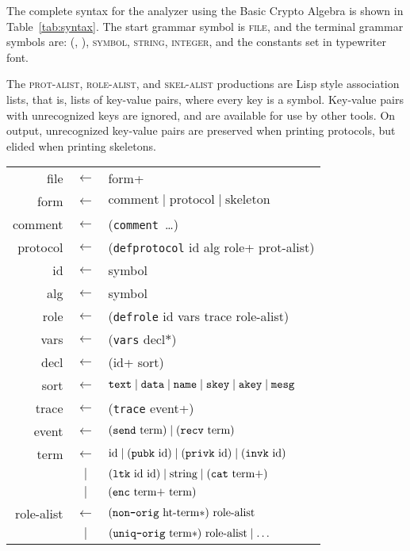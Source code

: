 The complete syntax for the analyzer using the Basic Crypto Algebra is
shown in Table~\ref{tab:syntax}.  The start grammar symbol is
\textsc{file}, and the terminal grammar symbols are: \textsc{(, ),
  symbol, string, integer,} and the constants set in typewriter font.

The \textsc{prot-alist}, \textsc{role-alist}, and \textsc{skel-alist}
productions are Lisp style association lists, that is, lists of
key-value pairs, where every key is a symbol.  Key-value pairs with
unrecognized keys are ignored, and are available for use by other
tools.  On output, unrecognized key-value pairs are preserved when
printing protocols, but elided when printing skeletons.

\begin{table}
\newcommand{\sym}[1]{\textup{\texttt{#1}}}
\begin{center}\scshape
\begin{tabular}{rcl}
file&$\leftarrow$&form+
\\form&$\leftarrow$&
$\mbox{comment}\mid\mbox{protocol}\mid\mbox{skeleton}$
\\ comment&$\leftarrow$&
(\sym{comment}~\ldots)
\\ protocol&$\leftarrow$&
(\sym{defprotocol} id alg role+ prot-alist)
\\ id&$\leftarrow$&symbol
\\ alg&$\leftarrow$&symbol
\\ role&$\leftarrow$&
(\sym{defrole} id vars trace role-alist)
\\ vars&$\leftarrow$&
(\sym{vars} decl$\ast$)
\\ decl&$\leftarrow$&
(id+ sort)
\\ sort&$\leftarrow$&
$\sym{text} \mid \sym{data} \mid \sym{name} \mid \sym{skey}
\mid \sym{akey}\mid\sym{mesg}$
\\ trace&$\leftarrow$&(\sym{trace} event+)
\\ event&$\leftarrow$&
$(\sym{send}\mbox{ term})\mid(\sym{recv}\mbox{ term})$
\\ term&$\leftarrow$&
$\mbox{id}\mid(\sym{pubk}\mbox{ id})
\mid(\sym{privk}\mbox{ id})
\mid(\sym{invk}\mbox{ id})$
\\ &$\mid$&$(\sym{ltk}\mbox{ id id})\mid\mbox{string}\mid(\sym{cat}\mbox{ term+})$
\\ &$\mid$&$(\sym{enc}\mbox{ term+ term})$
\\ role-alist&$\leftarrow$&$
(\sym{non-orig}\mbox{ ht-term}\ast)\mbox{ role-alist}$
\\ &$\mid$&$(\sym{uniq-orig}\mbox{ term}\ast)\mbox{ role-alist}\mid\ldots$

\end{tabular}
\end{center}
\end{table}
